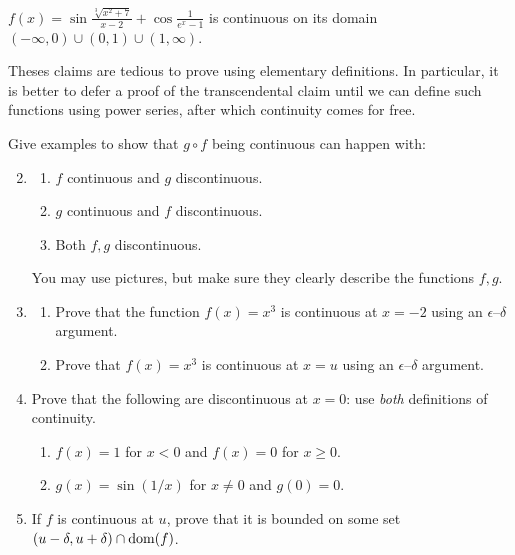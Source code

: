 \begin{example}{}{}
	$f(x)=\sin\frac{\sqrt[3]{x^2+7}}{x-2}+\cos\frac 1{e^x-1}$ is continuous on its domain $(-\infty,0)\cup(0,1)\cup(1,\infty)$.
\end{example}


Theses claims are tedious to prove using elementary definitions. In particular, it is better to defer a proof of the transcendental claim until we can define such functions using power series, after which continuity comes for free.


\vfil\goodbreak

\begin{exercises}
	\exstart Give examples to show that $g\circ f$ being continuous can happen with:\vspace{-5pt}
	\begin{enumerate}\setcounter{enumi}{1}  
	  \item[]\begin{enumerate}
	    \item $f$ continuous and $g$ discontinuous.
	    \item $g$ continuous and $f$ discontinuous.
	    \item Both $f,g$ discontinuous.
	  \end{enumerate}
	  You may use pictures, but make sure they clearly describe the functions $f,g$.
	  
	  
	  \item\begin{enumerate}
	  	\item Prove that the function $f(x)=x^3$ is continuous at $x=-2$ using an $\epsilon$--$\delta$ argument.
	  	\item Prove that $f(x)=x^3$ is continuous at $x=u$ using an $\epsilon$--$\delta$ argument.
	  \end{enumerate}
	
	
		\item Prove that the following are discontinuous at $x=0$: use \emph{both} definitions of continuity.
		\begin{enumerate}
	  	\item $f(x)=1$ for $x<0$ and $f(x)=0$ for $x\ge 0$.
	  	\item $g(x)=\sin(1/x)$ for $x\neq 0$ and $g(0)=0$.
		\end{enumerate}
		
		
		\item If $f$ is continuous at $u$, prove that it is bounded on some set $(u-\delta,u+\delta)\cap \operatorname{dom}(f)$.
	

\end{enumerate}
\end{exercises}
